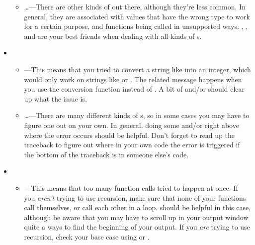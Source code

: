 \documentclass{handout}
\begin{document}
\begin{itemize}
\begin{itemize}
  \item \ldots---There are other kinds of  out there, although they're less common. In general, they are associated with values that have the wrong type to work for a certain purpose, and functions being called in unsupported ways. , , and  are your best friends when dealing with all kinds of s.
\end{itemize}

\item {}

\begin{itemize}
  \item {}---This means that you tried to convert a string like  into an integer, which would only work on strings like  or . The related message  happens when you use the  conversion function instead of . A bit of  and/or  should clear up what the issue is.
  \item \ldots---There are many different kinds of s, so in some cases you may have to figure one out on your own. In general, doing some  and/or  right above where the error occurs should be helpful. Don't forget to read up the traceback to figure out where in your own code the error is triggered if the bottom of the traceback is in someone else's code.
\end{itemize}

\item {}

\begin{itemize}
  \item {}---This means that too many function calls tried to happen at once. If you \emph{aren't} trying to use recursion, make sure that none of your functions call themselves, or call each other in a loop.  should be helpful in this case, although be aware that you may have to scroll up in your output window quite a ways to find the beginning of your output. If you \emph{are} trying to use recursion, check your base case using  or .

\end{itemize}


\end{itemize}
\end{document}
